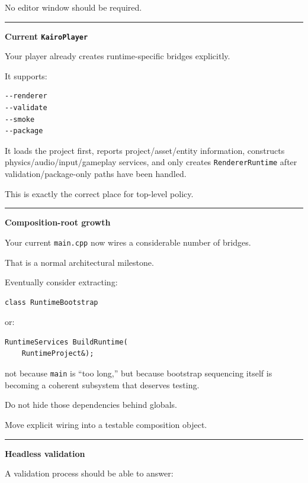 No editor window should be required.

\begin{center}\rule{0.5\linewidth}{0.5pt}\end{center}

\textbf{Current \texttt{KairoPlayer}}

Your player already creates runtime-specific bridges explicitly.

It supports:

\begin{verbatim}
--renderer
--validate
--smoke
--package
\end{verbatim}

It loads the project first, reports project/asset/entity information, constructs physics/audio/input/gameplay services, and only creates \texttt{RendererRuntime} after validation/package-only paths have been handled.

This is exactly the correct place for top-level policy.

\begin{center}\rule{0.5\linewidth}{0.5pt}\end{center}

\textbf{Composition-root growth}

Your current \texttt{main.cpp} now wires a considerable number of bridges.

That is a normal architectural milestone.

Eventually consider extracting:

\begin{verbatim}
class RuntimeBootstrap
\end{verbatim}

or:

\begin{verbatim}
RuntimeServices BuildRuntime(
    RuntimeProject&);
\end{verbatim}

not because \texttt{main} is ``too long,'' but because bootstrap sequencing itself is becoming a coherent subsystem that deserves testing.

Do not hide those dependencies behind globals.

Move explicit wiring into a testable composition object.

\begin{center}\rule{0.5\linewidth}{0.5pt}\end{center}

\textbf{Headless validation}

A validation process should be able to answer:

